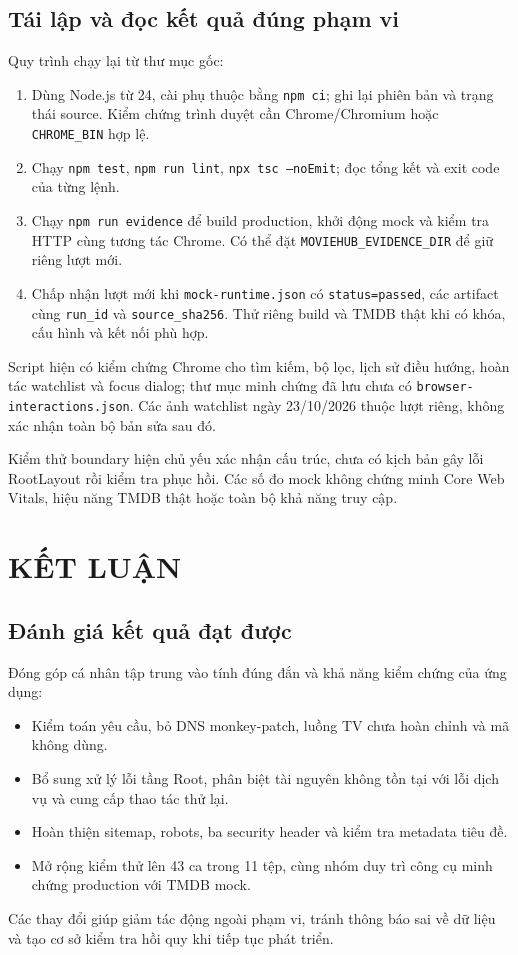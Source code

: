 \documentclass[12pt,a4paper]{extarticle}
\begin{document}
\subsection{Tái lập và đọc kết quả đúng phạm vi}
Quy trình chạy lại từ thư mục gốc:
\begin{enumerate}
    \item Dùng Node.js từ 24, cài phụ thuộc bằng \texttt{npm ci}; ghi lại phiên bản và trạng thái source. Kiểm chứng trình duyệt cần Chrome/Chromium hoặc \texttt{CHROME\_BIN} hợp lệ.
    \item Chạy \texttt{npm test}, \texttt{npm run lint}, \texttt{npx tsc --noEmit}; đọc tổng kết và exit code của từng lệnh.
    \item Chạy \texttt{npm run evidence} để build production, khởi động mock và kiểm tra HTTP cùng tương tác Chrome. Có thể đặt \texttt{MOVIEHUB\_EVIDENCE\_DIR} để giữ riêng lượt mới.
    \item Chấp nhận lượt mới khi \nolinkurl{mock-runtime.json} có \texttt{status=passed}, các artifact cùng \texttt{run\_id} và \texttt{source\_sha256}. Thử riêng build và TMDB thật khi có khóa, cấu hình và kết nối phù hợp.
\end{enumerate}
Script hiện có kiểm chứng Chrome cho tìm kiếm, bộ lọc, lịch sử điều hướng, hoàn tác watchlist và focus dialog; thư mục minh chứng đã lưu chưa có \nolinkurl{browser-interactions.json}. Các ảnh watchlist ngày 23/10/2026 thuộc lượt riêng, không xác nhận toàn bộ bản sửa sau đó.

Kiểm thử boundary hiện chủ yếu xác nhận cấu trúc, chưa có kịch bản gây lỗi RootLayout rồi kiểm tra phục hồi. Các số đo mock không chứng minh Core Web Vitals, hiệu năng TMDB thật hoặc toàn bộ khả năng truy cập.

\clearpage
\section{KẾT LUẬN}
\subsection{Đánh giá kết quả đạt được}
Đóng góp cá nhân tập trung vào tính đúng đắn và khả năng kiểm chứng của ứng dụng:
\begin{itemize}
    \item Kiểm toán yêu cầu, bỏ DNS monkey-patch, luồng TV chưa hoàn chỉnh và mã không dùng.
    \item Bổ sung xử lý lỗi tầng Root, phân biệt tài nguyên không tồn tại với lỗi dịch vụ và cung cấp thao tác thử lại.
    \item Hoàn thiện sitemap, robots, ba security header và kiểm tra metadata tiêu đề.
    \item Mở rộng kiểm thử lên 43 ca trong 11 tệp, cùng nhóm duy trì công cụ minh chứng production với TMDB mock.
\end{itemize}
Các thay đổi giúp giảm tác động ngoài phạm vi, tránh thông báo sai về dữ liệu và tạo cơ sở kiểm tra hồi quy khi tiếp tục phát triển.
\end{document}
